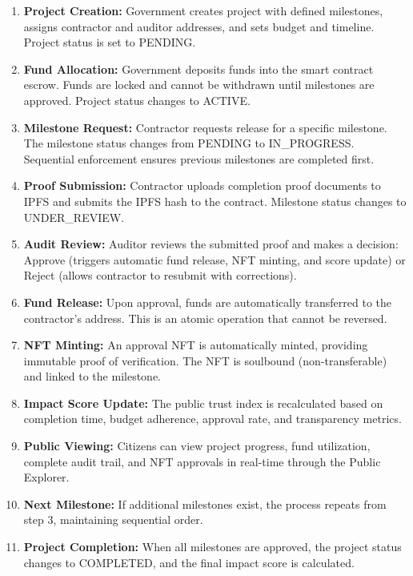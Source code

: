 \documentclass[12pt,a4wide]{report}
\theoremstyle{plain}
\theoremstyle{definition}
\theoremstyle{remark}
\begin{document}
\begin{enumerate}
    \item \textbf{Project Creation:} Government creates project with defined milestones, assigns contractor and auditor addresses, and sets budget and timeline. Project status is set to PENDING.
    
    \item \textbf{Fund Allocation:} Government deposits funds into the smart contract escrow. Funds are locked and cannot be withdrawn until milestones are approved. Project status changes to ACTIVE.
    
    \item \textbf{Milestone Request:} Contractor requests release for a specific milestone. The milestone status changes from PENDING to IN\_PROGRESS. Sequential enforcement ensures previous milestones are completed first.
    
    \item \textbf{Proof Submission:} Contractor uploads completion proof documents to IPFS and submits the IPFS hash to the contract. Milestone status changes to UNDER\_REVIEW.
    
    \item \textbf{Audit Review:} Auditor reviews the submitted proof and makes a decision: Approve (triggers automatic fund release, NFT minting, and score update) or Reject (allows contractor to resubmit with corrections).
    
    \item \textbf{Fund Release:} Upon approval, funds are automatically transferred to the contractor's address. This is an atomic operation that cannot be reversed.
    
    \item \textbf{NFT Minting:} An approval NFT is automatically minted, providing immutable proof of verification. The NFT is soulbound (non-transferable) and linked to the milestone.
    
    \item \textbf{Impact Score Update:} The public trust index is recalculated based on completion time, budget adherence, approval rate, and transparency metrics.
    
    \item \textbf{Public Viewing:} Citizens can view project progress, fund utilization, complete audit trail, and NFT approvals in real-time through the Public Explorer.
    
    \item \textbf{Next Milestone:} If additional milestones exist, the process repeats from step 3, maintaining sequential order.
    
    \item \textbf{Project Completion:} When all milestones are approved, the project status changes to COMPLETED, and the final impact score is calculated.
\end{enumerate}
\end{document}
